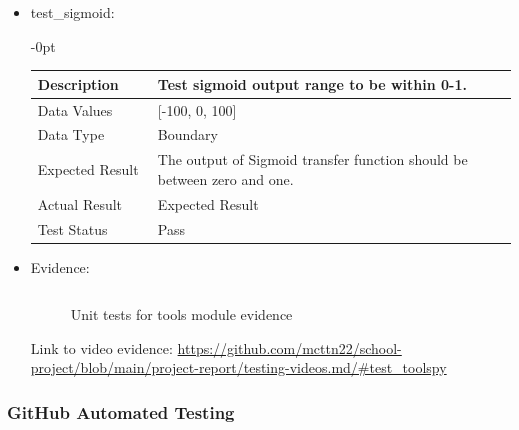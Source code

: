 \documentclass[./project-report/src/latex/project-report.tex]{subfiles}
\begin{document}
\begin{itemize}
\begin{itemize}
\begin{itemize}
					\item test\_sigmoid: \newline
					\begin{adjustwidth}{-\leftmargin}{0pt}
					\begin{tabular}{|p{0.25\linewidth}|p{0.75\linewidth}|}
						\hline
						Description & Test sigmoid output range to be within 0-1. \\
						\hline
						Data Values & [-100, 0, 100] \\
						\hline
						Data Type & Boundary \\
						\hline
						Expected Result & The output of Sigmoid transfer function should be between zero and one. \\
						\hline
						Actual Result & Expected Result \\
						\hline
						Test Status & Pass \\
						\hline
					\end{tabular}
					\end{adjustwidth}

					\vspace{5mm}

					\item Evidence:
                		\inputminted{python}{./school_project/test/models/cpu/utils/test_tools.py}

						\pagebreak

						\begin{figure}[h!]
						\centering
						\caption{Unit tests for tools module evidence}
						\end{figure}
	
						Link to video evidence: \url{https://github.com/mcttn22/school-project/blob/main/project-report/testing-videos.md/#test_toolspy}
				\end{itemize}
        \end{itemize}
\end{itemize}

\subsubsection{GitHub Automated Testing}
\end{document}
